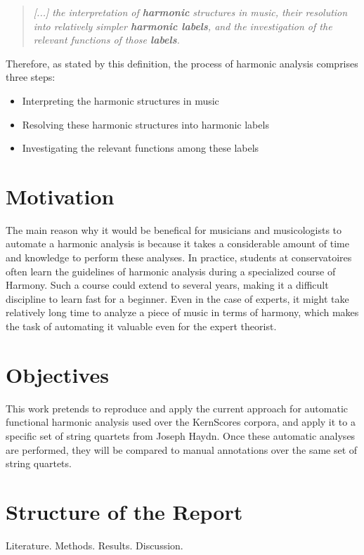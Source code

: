 \begin{quote}
\centering
\emph{[...] the interpretation of \textbf{harmonic} structures in music, \linebreak
their resolution into relatively simpler \textbf{harmonic labels}, \linebreak and the investigation of the relevant functions of those \textbf{labels}.}
\end{quote}

Therefore, as stated by this definition, the process of harmonic analysis comprises three steps:

\begin{itemize}
  \item Interpreting the harmonic structures in music
  \item Resolving these harmonic structures into harmonic labels
  \item Investigating the relevant functions among these labels
\end{itemize}

\section{Motivation}
The main reason why it would be benefical for musicians and musicologists to automate a harmonic analysis is because it takes a considerable amount of time and knowledge to perform these analyses. In practice, students at conservatoires often learn the guidelines of harmonic analysis during a specialized course of Harmony. Such a course could extend to several years, making it a difficult discipline to learn fast for a beginner. Even in the case of experts, it might take relatively long time to analyze a piece of music in terms of harmony, which makes the task of automating it valuable even for the expert theorist.

\section{Objectives}
This work pretends to reproduce and apply the current approach for automatic functional harmonic analysis used over the KernScores corpora, and apply it to a specific set of string quartets from Joseph Haydn. Once these automatic analyses are performed, they will be compared to manual annotations over the same set of string quartets.

\section{Structure of the Report}
Literature. Methods. Results. Discussion.

\newpage
